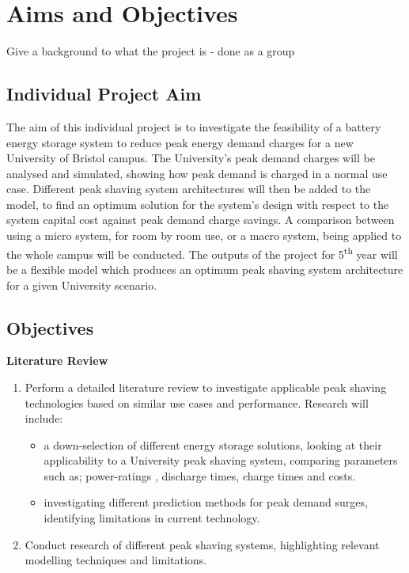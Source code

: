 \section{Aims and Objectives}\label{aims-and-objectives}

Give a background to what the project is - done as a group

\newpage

\subsection{Individual Project Aim}\label{individual-project-aim}

The aim of this individual project is to investigate the feasibility of
a battery energy storage system to reduce peak energy demand charges for
a new University of Bristol campus. The University's peak demand charges
will be analysed and simulated, showing how peak demand is charged in a
normal use case. Different peak shaving system architectures will then
be added to the model, to find an optimum solution for the system's
design with respect to the system capital cost against peak demand
charge savings. A comparison between using a micro system, for room by
room use, or a macro system, being applied to the whole campus will be
conducted. The outputs of the project for 5\textsuperscript{th} year
will be a flexible model which produces an optimum peak shaving system
architecture for a given University scenario.

\subsection{Objectives}\label{objectives}

\textbf{Literature Review}

\begin{enumerate}
\item Perform a detailed literature review to investigate applicable peak shaving technologies based on similar use cases and performance. Research will include:
    \begin{itemize}
 \item a down-selection of different energy storage solutions, looking at their applicability to a University peak shaving system, comparing parameters such as; power-ratings , discharge times, charge times and costs.
\item investigating different prediction methods for peak demand surges, identifying limitations in current technology.
    \end{itemize}
\item Conduct research of different peak shaving systems, highlighting relevant modelling techniques and limitations.
\end{enumerate}

